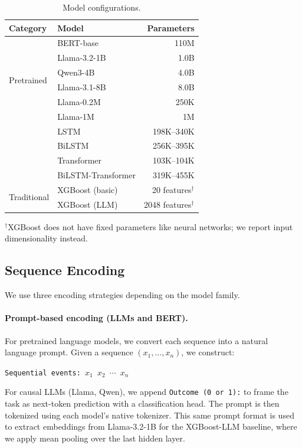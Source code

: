 \begin{table}[h]
\centering
\caption{Model configurations.}
\label{tab:models}
\begin{tabular}{llr}
\toprule
Category & Model & Parameters \\
\midrule
\multirow{6}{*}{Pretrained} 
  & BERT-base & 110M \\
  & Llama-3.2-1B & 1.0B \\
  & Qwen3-4B & 4.0B\\
  & Llama-3.1-8B & 8.0B \\
\midrule
\multirow{4}{*}{From scratch}
    & Llama-0.2M & 250K \\
  & Llama-1M & 1M  \\
  & LSTM & 198K--340K \\
  & BiLSTM & 256K--395K \\
  & Transformer & 103K--104K \\
  & BiLSTM-Transformer & 319K--455K \\
\midrule
\multirow{2}{*}{Traditional}
  & XGBoost (basic) & 20 features$^\dagger$ \\
  & XGBoost (LLM) & 2048 features$^\dagger$ \\
\bottomrule
\end{tabular}
\vspace{0.5em}
\raggedright\footnotesize{$^\dagger$XGBoost does not have fixed parameters like neural networks; we report input dimensionality instead.}
\end{table}

\subsection{Sequence Encoding}
\label{subsec:encoding}

We use three encoding strategies depending on the model family.

\paragraph{Prompt-based encoding (LLMs and BERT).}
For pretrained language models, we convert each sequence into a natural language prompt. Given a sequence $(x_1, \ldots, x_n)$, we construct:
\begin{center}
\texttt{Sequential events: $x_1$ $x_2$ $\cdots$ $x_n$}
\end{center}
For causal LLMs (Llama, Qwen), we append \texttt{Outcome (0 or 1):} to frame the task as next-token prediction with a classification head. The prompt is then tokenized using each model's native tokenizer. This same prompt format is used to extract embeddings from Llama-3.2-1B for the XGBoost-LLM baseline, where we apply mean pooling over the last hidden layer.

